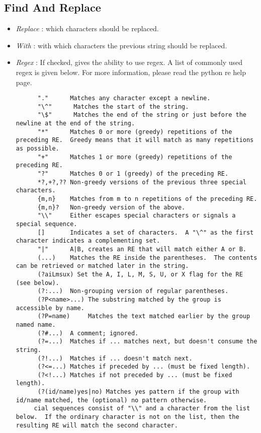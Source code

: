 \documentclass[12pt, a4paper]{scrartcl}
\begin{document}
\subsection{Find And Replace}
\begin{itemize}
    \item \emph{Replace} : which characters should be replaced.
    \item \emph{With} : with which characters the previous string should be replaced.
    \item \emph{Regex} : If checked, gives the ability to use regex. A list of commonly used regex is given below. For more information, please read the python re help page.
        \begin{verbatim}
      "."      Matches any character except a newline.
      "\^"      Matches the start of the string.
      "\$"      Matches the end of the string or just before the newline at the end of the string.
      "*"      Matches 0 or more (greedy) repetitions of the preceding RE.  Greedy means that it will match as many repetitions as possible.
      "+"      Matches 1 or more (greedy) repetitions of the preceding RE.
      "?"      Matches 0 or 1 (greedy) of the preceding RE.
      *?,+?,?? Non-greedy versions of the previous three special characters.
      {m,n}    Matches from m to n repetitions of the preceding RE.
      {m,n}?   Non-greedy version of the above.
      "\\"     Either escapes special characters or signals a special sequence.
      []       Indicates a set of characters.  A "\^" as the first character indicates a complementing set.
      "|"      A|B, creates an RE that will match either A or B.
      (...)    Matches the RE inside the parentheses.  The contents can be retrieved or matched later in the string.
      (?aiLmsux) Set the A, I, L, M, S, U, or X flag for the RE (see below).
      (?:...)  Non-grouping version of regular parentheses.
      (?P<name>...) The substring matched by the group is accessible by name.
      (?P=name)     Matches the text matched earlier by the group named name.
      (?#...)  A comment; ignored.
      (?=...)  Matches if ... matches next, but doesn't consume the string.
      (?!...)  Matches if ... doesn't match next.
      (?<=...) Matches if preceded by ... (must be fixed length).
      (?<!...) Matches if not preceded by ... (must be fixed length).
      (?(id/name)yes|no) Matches yes pattern if the group with id/name matched, the (optional) no pattern otherwise.
     cial sequences consist of "\\" and a character from the list below.  If the ordinary character is not on the list, then the resulting RE will match the second character.

\end{verbatim}
\end{itemize}
\end{document}
